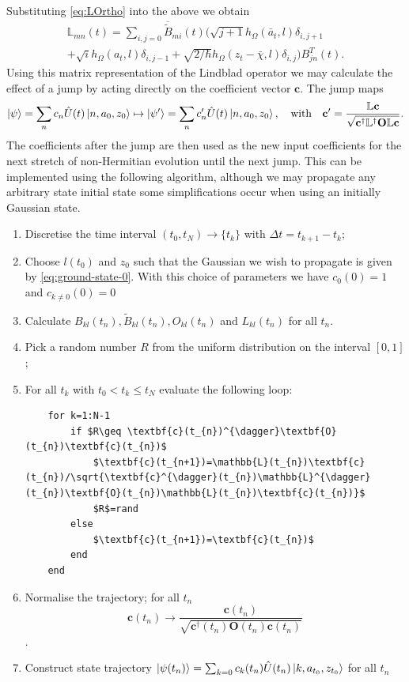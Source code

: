 \documentclass[12pt]{iopart} %
\begin{document}
Substituting \cref{eq:LOrtho} into the above we obtain
\begin{multline}
	\mathbb{L}_{mn}(t)=\sum_{i,j=0}\overline{\widetilde{B}}_{mi}(t)\big(\sqrt{j+1} h_{\Omega}(\bar{a}_t,l) \delta_{i,j+1}\\+\sqrt{i}h_{\Omega} (a_t, l)\delta_{i,j-1}+\sqrt{2/\hbar}  h_{\Omega}(z_t-\bar{\chi},l)\delta_{i,j}\big)B^T_{j n}(t).
\end{multline}
Using this matrix representation of the Lindblad operator we may calculate the effect of a jump by acting directly on the coefficient vector $\mathbf{c}$. The jump maps 
\begin{equation} \label{eqn:Hagjumpcoeffmap}
\ket{\psi}=\sum_n c_n \hat{U}(t)\ket{n,a_0,z_0}\mapsto \ket{\psi'}=\sum_n  c'_n \hat{U}(t)\ket{n,a_0,z_0}, \quad\text{with}\quad \mathbf{c}'=\frac{\mathbb{L} \mathbf{c}}{\sqrt{\mathbf{c}^{\dagger}\mathbb{L}^{\dagger}\mathbf{O} \mathbb{L} \mathbf{c}}}.
\end{equation}
The coefficients after the jump are then used as the new input coefficients for the next stretch of non-Hermitian evolution until the next jump. This can be implemented using the following algorithm, although we may propagate any arbitrary state initial state some simplifications occur when using an initially Gaussian state. 
\begin{enumerate} 
	\item Discretise the time interval $(t_0,t_N) \rightarrow \{t_k \} $ with $\Delta t=t_{k+1}-t_k$;
	\item Choose $l(t_0)$ and $z_0$ such that the Gaussian we wish to propagate is given by \cref{eq:ground-state-0}. With this choice of parameters we have $c_0(0)=1$ and $c_{k\neq0}(0)=0$
	\item Calculate $B_{kl}(t_n),\widetilde{B}_{kl}(t_n),O_{kl}(t_n)$ and $L_{kl}(t_n)$ for all $t_n$.
	\item Pick a random number $R$ from the uniform distribution on the interval $[0,1]$;
	\item For all $t_k$ with $t_0< t_k\leq t_N$ evaluate the following loop:
    \begin{lstlisting}
    for k=1:N-1
        if $R\geq \textbf{c}(t_{n})^{\dagger}\textbf{O}(t_{n})\textbf{c}(t_{n})$ 
            $\textbf{c}(t_{n+1})=\mathbb{L}(t_{n})\textbf{c}(t_{n})/\sqrt{\textbf{c}^{\dagger}(t_{n})\mathbb{L}^{\dagger}(t_{n})\textbf{O}(t_{n})\mathbb{L}(t_{n})\textbf{c}(t_{n})}$
            $R$=rand 
        else 
            $\textbf{c}(t_{n+1})=\textbf{c}(t_{n})$ 
        end
    end
    \end{lstlisting}
    \item Normalise the trajectory; for all $t_n$ $$\mathbf{c}(t_n)\to \frac{\mathbf{c}(t_n)}{\sqrt{\mathbf{c}^{\dagger}(t_n)\mathbf{O}(t_n)\mathbf{c}(t_n)}}$$.
    \item Construct state trajectory $\ket{\psi(t_n)}=\sum_{k=0} c_k(t_n)\hat{U}(t_n)\ket{k,a_{t_0},z_{t_0}}$ for all $t_n$ 
\end{enumerate}
\end{document}

